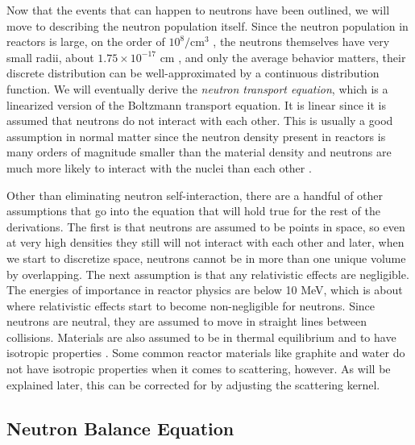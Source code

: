 Now that the events that can happen to neutrons have been outlined, we will move to describing the neutron population itself.  Since the neutron population in reactors is large, on the order of $10^{8}/\mathrm{cm}^3$ \cite{duderstadt}, the neutrons themselves have very small radii, about $1.75\times10^{-17}$ cm \cite{krane}, and only the average behavior matters, their discrete distribution can be well-approximated by a continuous distribution function.  We will eventually derive the \emph{neutron transport equation}, which is a linearized version of the Boltzmann transport equation.  It is linear since it is assumed that neutrons do not interact with each other.  This is usually a good assumption in normal matter since the neutron density present in reactors is many orders of magnitude smaller than the material density and neutrons are much more likely to interact with the nuclei than each other \cite{duderstadt}.  

Other than eliminating neutron self-interaction, there are a handful of other assumptions that go into the equation that will hold true for the rest of the derivations.  The first is that neutrons are assumed to be points in space, so even at very high densities they still will not interact with each other and later, when we start to discretize space, neutrons cannot be in more than one unique volume by overlapping.  The next assumption is that any relativistic effects are negligible.  The energies of importance in reactor physics are below 10 MeV, which is about where relativistic effects start to become non-negligible for neutrons.  Since neutrons are neutral, they are assumed to move in straight lines between collisions.  Materials are also assumed to be in thermal equilibrium and to have isotropic properties \cite{duderstadt}.  Some common reactor materials like graphite and water do not have isotropic properties when it comes to scattering, however.  As will be explained later, this can be corrected for by adjusting the scattering kernel.

\subsection{Neutron Balance Equation}

